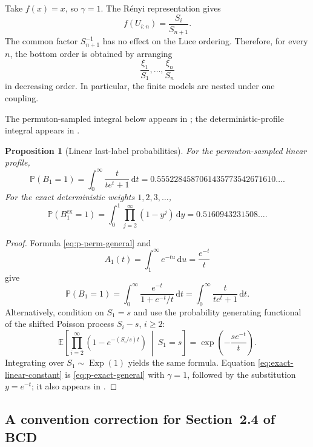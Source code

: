 \documentclass[11pt]{article}
\numberwithin{equation}{section}
\newtheorem{proposition}[theorem]{Proposition}
\theoremstyle{definition}
\theoremstyle{remark}
\newcommand{\Pp}{\mathbb P}
\newcommand{\Ee}{\mathbb E}
\newcommand{\Exp}{\operatorname{Exp}}
\newcommand{\dd}{\,\mathrm d}
\begin{document}
Take $f(x)=x$, so $\gamma=1$.  The R\'enyi representation gives
\[
  f(U_{i:n})=\frac{S_i}{S_{n+1}}.
\]
The common factor $S_{n+1}^{-1}$ has no effect on the Luce ordering.  Therefore, for every $n$, the bottom order is obtained by arranging
\begin{equation}
  \frac{\xi_1}{S_1},\ldots,\frac{\xi_n}{S_n}
  \label{eq:linear-exact-coupling}
\end{equation}
in decreasing order.  In particular, the finite models are nested under one coupling.

The permuton-sampled integral below appears in \cite[Proposition~27 and the following paragraph]{PitmanTran}; the deterministic-profile integral appears in \cite[Section~4.2]{CDK}.

\begin{proposition}[Linear last-label probabilities]
\label{prop:bcd-constant}
For the permuton-sampled linear profile,
\begin{equation}
  \Pp(B_1=1)
  =\int_0^\infty\frac{t}{te^t+1}\dd t
  =0.5552284587061435773542671610\ldots.
  \label{eq:bcd-constant}
\end{equation}
For the exact deterministic weights $1,2,3,\ldots$,
\begin{equation}
  \Pp(B_1^{\mathrm{ex}}=1)
  =\int_0^1\prod_{j=2}^\infty(1-y^j)\dd y
  =0.5160943231508\ldots.
  \label{eq:exact-linear-constant}
\end{equation}
\end{proposition}

\begin{proof}
Formula \eqref{eq:p-perm-general} and
\[
  A_1(t)=\int_1^\infty e^{-tu}\dd u=\frac{e^{-t}}{t}
\]
give
\[
  \Pp(B_1=1)
  =\int_0^\infty\frac{e^{-t}}{1+e^{-t}/t}\dd t
  =\int_0^\infty\frac{t}{te^t+1}\dd t.
\]
Alternatively, condition on $S_1=s$ and use the probability generating functional of the shifted Poisson process $S_i-s$, $i\geq2$:
\[
  \Ee\left[
  \prod_{i=2}^\infty\left(1-e^{-(S_i/s)t}\right)
  \ \middle|\ S_1=s\right]
  =\exp\left(-\frac{s e^{-t}}{t}\right).
\]
Integrating over $S_1\sim\Exp(1)$ yields the same formula.  Equation \eqref{eq:exact-linear-constant} is \eqref{eq:p-exact-general} with $\gamma=1$, followed by the substitution $y=e^{-t}$; it also appears in \cite[Section~4.2]{CDK}.
\end{proof}

\subsection{A convention correction for Section~2.4 of BCD}
\label{subsec:orientation}
\end{document}
